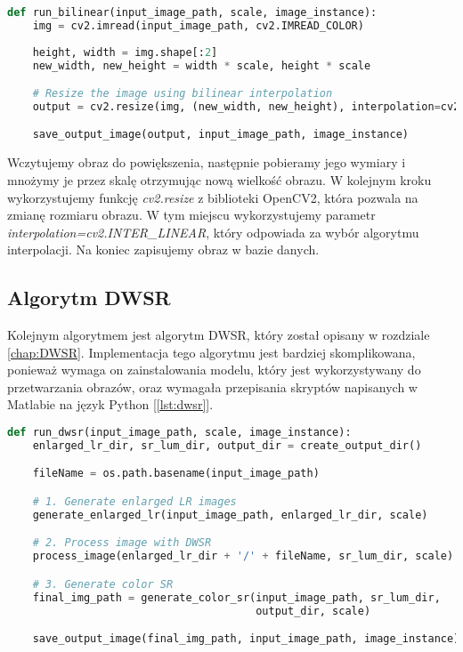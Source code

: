 \begin{lstlisting}[language=Python, caption=Implementacja algorytmu Bilinear., label={lst:bilinear}]
def run_bilinear(input_image_path, scale, image_instance):
    img = cv2.imread(input_image_path, cv2.IMREAD_COLOR)
    
    height, width = img.shape[:2]
    new_width, new_height = width * scale, height * scale

    # Resize the image using bilinear interpolation
    output = cv2.resize(img, (new_width, new_height), interpolation=cv2.INTER_LINEAR)

    save_output_image(output, input_image_path, image_instance)
\end{lstlisting}

Wczytujemy obraz do powiększenia, następnie pobieramy jego wymiary i mnożymy je przez skalę otrzymując nową wielkość obrazu. W kolejnym kroku wykorzystujemy funkcję \textit{cv2.resize} z biblioteki OpenCV2, która pozwala na zmianę rozmiaru obrazu. W tym miejscu wykorzystujemy parametr \textit{interpolation=cv2.INTER\_LINEAR}, który odpowiada za wybór algorytmu interpolacji. Na koniec zapisujemy obraz w bazie danych.


\subsection*{Algorytm DWSR}

Kolejnym algorytmem jest algorytm DWSR, który został opisany w rozdziale \ref{chap:DWSR}.
Implementacja tego algorytmu jest bardziej skomplikowana, ponieważ wymaga on zainstalowania modelu, który jest wykorzystywany do przetwarzania obrazów, oraz wymagała przepisania skryptów napisanych w Matlabie na język Python [\ref{lst:dwsr}].


\begin{lstlisting}[language=Python, caption=Implementacja algorytmu DWSR., label={lst:dwsr}]    
def run_dwsr(input_image_path, scale, image_instance):
    enlarged_lr_dir, sr_lum_dir, output_dir = create_output_dir()

    fileName = os.path.basename(input_image_path)

    # 1. Generate enlarged LR images
    generate_enlarged_lr(input_image_path, enlarged_lr_dir, scale) 

    # 2. Process image with DWSR
    process_image(enlarged_lr_dir + '/' + fileName, sr_lum_dir, scale)

    # 3. Generate color SR
    final_img_path = generate_color_sr(input_image_path, sr_lum_dir, 
                                       output_dir, scale) 

    save_output_image(final_img_path, input_image_path, image_instance)
\end{lstlisting}

